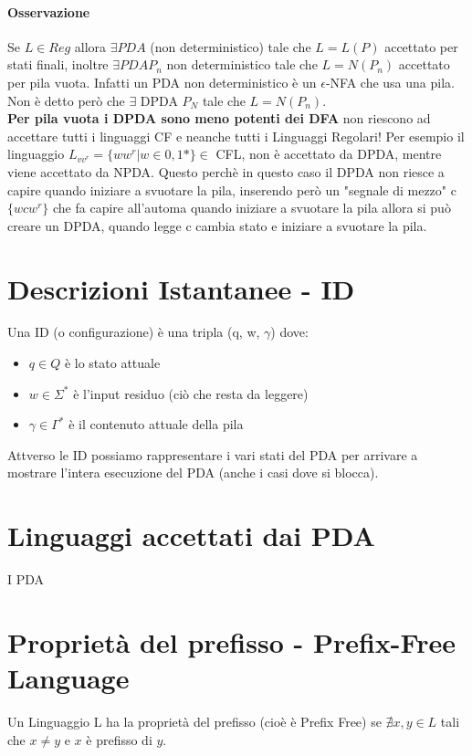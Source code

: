 
\paragraph*{Osservazione} Se $L\in Reg$ allora $\exists PDA$ (non deterministico)
tale che $L=L(P)$ accettato per stati finali, inoltre $\exists PDA P_n$ non deterministico tale che 
$L=N(P_n)$ accettato per pila vuota. Infatti un PDA non deterministico è un $\epsilon$-NFA che usa una pila.
\\ Non è detto però che $\exists$ DPDA $P_N$ tale che $L=N(P_n)$.
\\\textbf{Per pila vuota i DPDA sono meno potenti dei DFA} 
non riescono ad accettare tutti i linguaggi CF e neanche tutti i Linguaggi Regolari!
Per esempio il linguaggio $L_{vv^r} = \{ww^r | w \in {0,1}*\} \in$ CFL, non è accettato
da DPDA, mentre viene accettato da NPDA. Questo perchè in questo caso il DPDA non riesce
a capire quando iniziare a svuotare la pila, inserendo però un "segnale di mezzo" c $\{wcw^r\}$
che fa capire all'automa quando iniziare a svuotare la pila allora si può creare un DPDA, quando legge c
cambia stato e iniziare a svuotare la pila.
\section{Descrizioni Istantanee - ID}
Una ID (o configurazione) è una tripla (q, w, $\gamma$) dove:
\begin{itemize}
    \item $q \in Q$ è lo stato attuale
    \item $w \in \Sigma^*$ è l'input residuo (ciò che resta da leggere)
    \item $\gamma \in \Gamma^*$ è il contenuto attuale della pila
\end{itemize}
Attverso le ID possiamo rappresentare i vari stati del PDA per arrivare a
mostrare l'intera esecuzione del PDA (anche i casi dove si blocca).
\section{Linguaggi accettati dai PDA}
I PDA  
\section{Proprietà del prefisso - Prefix-Free Language}
\label{sec:Prefix-Free}
Un Linguaggio L ha la proprietà del prefisso (cioè è Prefix Free) se $\nexists x,y \in L$ tali che $x \neq y$ e $x$
è prefisso di $y$. 
